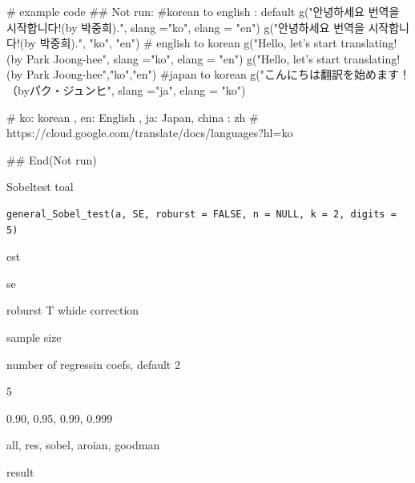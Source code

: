 \documentclass[a4paper]{book}
\begin{document}
\begin{Examples}
\begin{ExampleCode}
# example code
## Not run: 
#korean to english : default
g("안녕하세요 번역을 시작합니다!(by 박중희).", slang ="ko", elang = "en")
g("안녕하세요 번역을 시작합니다!(by 박중희).", "ko", "en")
# english to korean
g("Hello, let’s start translating! (by Park Joong-hee", slang ="ko", elang = "en")
g("Hello, let’s start translating! (by Park Joong-hee","ko","en")
#japan to korean
g("こんにちは翻訳を始めます！（byパク・ジュンヒ", slang ="ja", elang = "ko")

# ko: korean , en: English , ja: Japan, china : zh
# https://cloud.google.com/translate/docs/languages?hl=ko

## End(Not run)
\end{ExampleCode}
\end{Examples}
%
\begin{Description}
Sobeltest toal
\end{Description}
%
\begin{Usage}
\begin{verbatim}
general_Sobel_test(a, SE, roburst = FALSE, n = NULL, k = 2, digits = 5)
\end{verbatim}
\end{Usage}
%
\begin{Arguments}
\begin{ldescription}
\item[\code{a}] est

\item[\code{SE}] se

\item[\code{roburst}] roburst T whide correction

\item[\code{n}] sample size

\item[\code{k}] number of regressin coefs, default 2

\item[\code{digits}] 5

\item[\code{conf}] 0.90, 0.95, 0.99, 0.999

\item[\code{type}] all, res, sobel, aroian, goodman
\end{ldescription}
\end{Arguments}
%
\begin{Value}
result
\end{Value}
\end{document}
